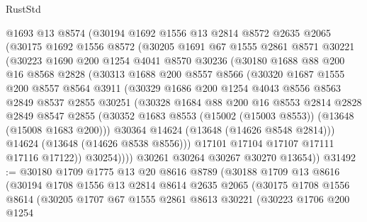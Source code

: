\begin{lexlean}{RustStd}
\begin{coremodule}
      @1693
      @13
      @8574
      (@30194
        @1692
        @1556
        @13
        @2814
        @8572
        @2635
        @2065
        (@30175
          @1692
          @1556
          @8572
          (@30205
            @1691
            @67
            @1555
            @2861
            @8571
            @30221
            (@30223
              @1690
              @200
              @1254
              @4041
              @8570
              @30236
              (@30180
                @1688
                @88
                @200
                @16
                @8568
                @2828
                (@30313
                  @1688
                  @200
                  @8557
                  @8566
                  (@30320
                    @1687
                    @1555
                    @200
                    @8557
                    @8564
                    @3911
                    (@30329
                      @1686
                      @200
                      @1254
                      @4043
                      @8556
                      @8563
                      @2849
                      @8537
                      @2855
                      @30251
                      (@30328
                        @1684
                        @88
                        @200
                        @16
                        @8553
                        @2814
                        @2828
                        @2849
                        @8547
                        @2855
                        (@30352 @1683 @8553 (@15002 (@15003 @8553)) (@13648 (@15008 @1683 @200)))
                        @30364
                        @14624
                        (@13648 (@14626 @8548 @2814)))
                      @14624
                      (@13648 (@14626 @8538 @8556)))
                    @17101
                    @17104
                    @17107
                    @17111
                    @17116
                    @17122))
                @30254))))
        @30261
        @30264
        @30267
        @30270
        @13654))
@31492 := @30180
    @1709
    @1775
    @13
    @20
    @8616
    @8789
    (@30188
      @1709
      @13
      @8616
      (@30194
        @1708
        @1556
        @13
        @2814
        @8614
        @2635
        @2065
        (@30175
          @1708
          @1556
          @8614
          (@30205
            @1707
            @67
            @1555
            @2861
            @8613
            @30221
            (@30223
              @1706
              @200
              @1254

\end{coremodule}
\end{lexlean}
